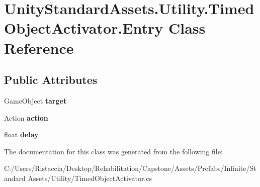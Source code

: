 \hypertarget{class_unity_standard_assets_1_1_utility_1_1_timed_object_activator_1_1_entry}{}\section{Unity\+Standard\+Assets.\+Utility.\+Timed\+Object\+Activator.\+Entry Class Reference}
\label{class_unity_standard_assets_1_1_utility_1_1_timed_object_activator_1_1_entry}
\subsection*{Public Attributes}
\begin{DoxyCompactItemize}
\item 
\mbox{\label{class_unity_standard_assets_1_1_utility_1_1_timed_object_activator_1_1_entry_a3e9d41eb28d6b3d02c23f535acdcd42b}} 
Game\+Object {\bfseries target}
\item 
\mbox{\label{class_unity_standard_assets_1_1_utility_1_1_timed_object_activator_1_1_entry_a84fbb4ec57c08061063377bd6df0270d}} 
Action {\bfseries action}
\item 
\mbox{\label{class_unity_standard_assets_1_1_utility_1_1_timed_object_activator_1_1_entry_a7b892e6433f3ab2fe212b171b57e9a75}} 
float {\bfseries delay}
\end{DoxyCompactItemize}


The documentation for this class was generated from the following file\+:\begin{DoxyCompactItemize}
\item 
C\+:/\+Users/\+Ristaccia/\+Desktop/\+Rehabilitation/\+Capstone/\+Assets/\+Prefabs/\+Infinite/\+Standard Assets/\+Utility/Timed\+Object\+Activator.\+cs\end{DoxyCompactItemize}
